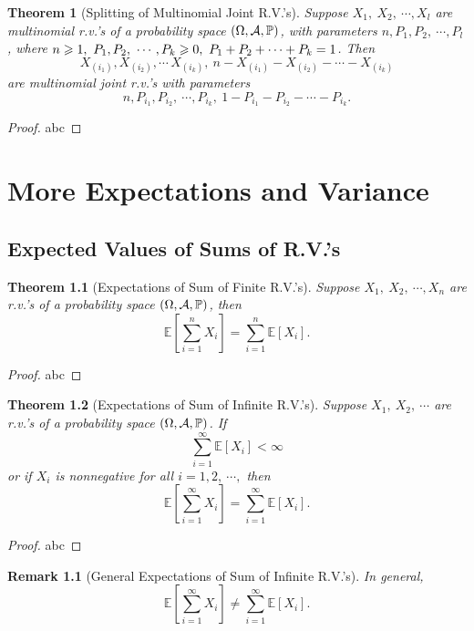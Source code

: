 \documentclass[openany,12pt]{book}
\newtheorem{theorem}{Theorem}[chapter]
\newtheorem{remark}{Remark}[chapter]
\begin{document}
\begin{theorem}[Splitting of Multinomial Joint R.V.'s]
Suppose $X_{1},\ X_{2},\ \cdots,X_{l}$ are multinomial r.v.'s of a probability space $(\Omega,\mathcal{A},\mathbb{P})$, with parameters $n,P_{1},P_{2},\ \cdots,P_{l}$,
where $n \geqslant 1,\ P_{1},P_{2},\ \cdots,P_{k} \geqslant 0,\ P_{1} + P_{2} + \cdots + P_{k} = 1$. Then
\[X_{(i_{1})},X_{(i_{2})},\cdots\,X_{\left( i_{k} \right)},\ n - X_{\left( i_{1} \right)} - X_{\left( i_{2} \right)} - \cdots - X_{\left( i_{k} \right)}\]
are multinomial joint r.v.'s with parameters \[n,P_{i_{1}},P_{i_{2}},\ \cdots,P_{i_{k}},\ 1 - P_{i_{1}} - P_{i_{2}} - \cdots - P_{i_{k}}.\]
\end{theorem}

\begin{proof}
  abc
\end{proof}

\chapter{More Expectations and Variance}

\section{Expected Values of Sums of R.V.'s}

\begin{theorem}[Expectations of Sum of Finite R.V.'s]
Suppose $X_{1},\ X_{2},\ \cdots,X_{n}$ are r.v.'s of a probability space $(\Omega,\mathcal{A},\mathbb{P})$, then
\[\mathbb{E}\left[ \sum_{i = 1}^{n}X_{i} \right] = \sum_{i = 1}^{n}{\mathbb{E}[ X_{i}]}.\]
\end{theorem}

\begin{proof}
  abc
\end{proof}

\begin{theorem}[Expectations of Sum of Infinite R.V.'s]
Suppose $X_{1},\ X_{2},\ \cdots$ are r.v.'s of a probability space $(\Omega,\mathcal{A},\mathbb{P})$. If \[\sum_{i = 1}^{\infty}{\mathbb{E}[ X_{i}]} < \infty\] or if
$X_{i}$ is nonnegative for all $i = 1,2,\ \cdots,$ then
\[\mathbb{E}\left[ \sum_{i = 1}^{\infty}X_{i} \right] = \sum_{i = 1}^{\infty}{\mathbb{E}[ X_{i}]}.\]
\end{theorem}

\begin{proof}
  abc
\end{proof}

\begin{remark}[General Expectations of Sum of Infinite R.V.'s]
In general,
\[\mathbb{E}\left[ \sum_{i = 1}^{\infty}X_{i} \right] \neq \sum_{i = 1}^{\infty}{\mathbb{E}[ X_{i}]}.\]
\end{remark}
\end{document}
